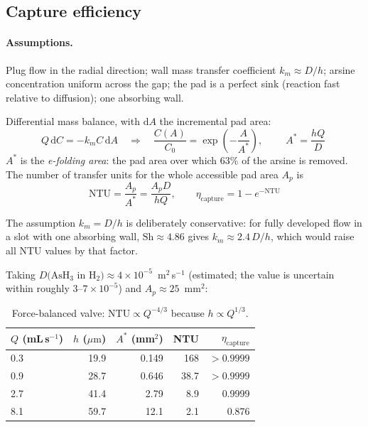 \documentclass[11pt,a4paper]{article}
\newcommand{\um}{\ensuremath{\mu\mathrm{m}}}
\begin{document}
\subsection{Capture efficiency}

\paragraph{Assumptions.} Plug flow in the radial direction; wall mass
transfer coefficient $k_m \approx D/h$; arsine concentration uniform across
the gap; the pad is a perfect sink (reaction fast relative to diffusion);
one absorbing wall.

Differential mass balance, with $\mathrm{d}A$ the incremental pad area:
\begin{equation}
  Q\,\mathrm{d}C = -k_m C\,\mathrm{d}A
  \quad\Longrightarrow\quad
  \frac{C(A)}{C_0} = \exp\!\left(-\frac{A}{A^{*}}\right),
  \qquad
  \boxed{\;A^{*} = \frac{hQ}{D}\;}
  \label{eq:astar}
\end{equation}
$A^{*}$ is the \emph{e-folding area}: the pad area over which 63\% of the
arsine is removed. The number of transfer units for the whole accessible
pad area $A_p$ is
\begin{equation}
  \mathrm{NTU} = \frac{A_p}{A^{*}} = \frac{A_p D}{hQ},
  \qquad
  \eta_{\text{capture}} = 1 - e^{-\mathrm{NTU}}
  \label{eq:ntu}
\end{equation}

The assumption $k_m = D/h$ is deliberately conservative: for fully developed
flow in a slot with one absorbing wall, $\mathrm{Sh} \approx 4.86$ gives
$k_m \approx 2.4\,D/h$, which would raise all NTU values by that factor.

Taking $D(\mathrm{AsH_3}$ in $\mathrm{H_2}) \approx
4\times10^{-5}$~m$^2$\,s$^{-1}$ (estimated; the value is uncertain within
roughly $3$--$7\times10^{-5}$) and $A_p \approx 25$~mm$^2$:

\begin{table}[h]
\centering
\caption{Force-balanced valve: $\mathrm{NTU} \propto Q^{-4/3}$
because $h \propto Q^{1/3}$.}
\begin{tabular}{lrrrr}
\toprule
$Q$ (mL\,s$^{-1}$) & $h$ (\um) & $A^{*}$ (mm$^2$) & NTU
& $\eta_{\text{capture}}$ \\
\midrule
0.3 & 19.9 & 0.149 & 168 & $>0.9999$ \\
0.9 & 28.7 & 0.646 & 38.7 & $>0.9999$ \\
2.7 & 41.4 & 2.79 & 8.9 & 0.9999 \\
8.1 & 59.7 & 12.1 & 2.1 & 0.876 \\
\bottomrule
\end{tabular}
\end{table}
\end{document}
